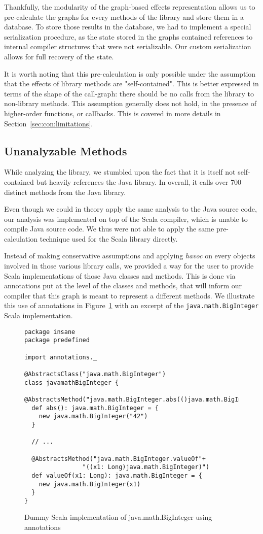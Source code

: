 Thankfully, the modularity of the graph-based effects representation allows us
to pre-calculate the graphs for every methods of the library and store them in
a database. To store those results in the database, we had to implement a
special serialization procedure, as the state stored in the graphs contained
references to internal compiler structures that were not serializable. Our custom
serialization allows for full recovery of the state.

It is worth noting that this pre-calculation is only possible under the
assumption that the effects of library methods are "self-contained". This is better
expressed in terms of the shape of the call-graph: there should be no calls
from the library to non-library methods. This assumption generally does not
hold, in the presence of higher-order functions, or callbacks. This is covered in more
details in Section~\ref{sec:con:limitations}.

\subsection{Unanalyzable Methods}
While analyzing the library, we stumbled upon the fact that it is itself not
self-contained but heavily references the Java library. In overall, it calls
over 700 distinct methods from the Java library.

Even though we could in theory apply the same analysis to the Java source code, our
analysis was implemented on top of the Scala compiler, which is unable to
compile Java source code. We thus were not able to apply the same
pre-calculation technique used for the Scala library directly.

Instead of making conservative assumptions and applying \emph{havoc} on every
objects involved in those various library calls, we provided a way for the user
to provide Scala implementations of those Java classes and methods. This is
done via annotations put at the level of the classes and methods, that will
inform our compiler that this graph is meant to represent a different methods.
We illustrate this use of annotations in Figure~\ref{fig:imp:annotations} with
an excerpt of the \verb=java.math.BigInteger= Scala implementation.
\begin{figure}[h]
    \centering
\begin{lstlisting}
package insane
package predefined

import annotations._

@AbstractsClass("java.math.BigInteger")
class javamathBigInteger {
  @AbstractsMethod("java.math.BigInteger.abs(()java.math.BigInteger)")
  def abs(): java.math.BigInteger = {
    new java.math.BigInteger("42")
  }

  // ...

  @AbstractsMethod("java.math.BigInteger.valueOf"+
                "((x1: Long)java.math.BigInteger)")
  def valueOf(x1: Long): java.math.BigInteger = {
    new java.math.BigInteger(x1)
  }
}
\end{lstlisting}
    \caption{Dummy Scala implementation of java.math.BigInteger using annotations}
    \label{fig:imp:annotations}
\end{figure}
